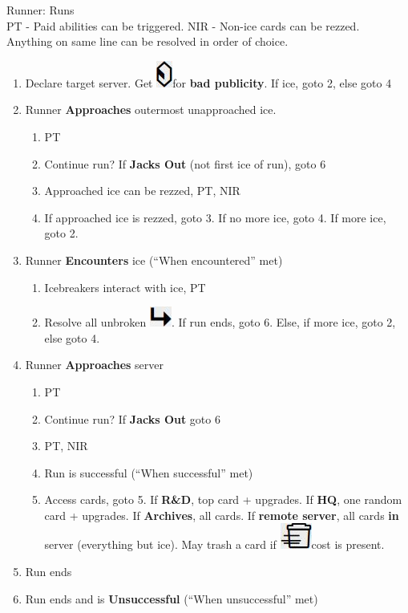 \documentclass[12pt]{article}
\newenvironment{enumerateCustom}
{\begin{enumerate}
  \setlength{\itemsep}{1pt}
  \setlength{\parskip}{0pt}
  \setlength{\parsep}{0pt}}
{\end{enumerate}}
\newcommand{\credit}{\includegraphics[scale=0.40]{images/creditLarge.jpg}\hspace{0.3em}}
\newcommand{\subroutineNoSpace}{\includegraphics[scale=0.40]{images/subroutineLarge.jpg}}
\newcommand{\trash}{\includegraphics[scale=0.40]{images/trashLarge.jpg}\hspace{0.3em}}
\begin{document}
\begin{multicols*}{2}
Runner: Runs
\\PT - Paid abilities can be triggered. NIR - Non-ice cards can be rezzed.\\
Anything on same line can be resolved in order of choice.
\begin{enumerateCustom}
	\item Declare target server. Get \credit for \textbf{bad publicity}. If ice, goto 2, else goto 4
	\item Runner \textbf{Approaches} outermost unapproached ice.
		\begin{enumerateCustom}
			\item PT
			\item Continue run? If \textbf{Jacks Out} (not first ice of run), goto 6
			\item Approached ice can be rezzed, PT, NIR
			\item If approached ice is rezzed, goto 3. If no more ice, goto 4. If more ice, goto 2.
		\end{enumerateCustom}
	\item Runner \textbf{Encounters} ice (``When encountered'' met)
		\begin{enumerateCustom}
			\item Icebreakers interact with ice, PT
			\item Resolve all unbroken \subroutineNoSpace. If run ends, goto 6. Else, if more ice, goto 2, else goto 4.
		\end{enumerateCustom}
	\item Runner \textbf{Approaches} server
		\begin{enumerateCustom}
			\item PT
			\item Continue run? If \textbf{Jacks Out} goto 6
			\item PT, NIR
			\item Run is successful (``When successful'' met)
			\item Access cards, goto 5. If \textbf{R\&D}, top card + upgrades. If \textbf{HQ}, one random card + upgrades. If \textbf{Archives}, all cards. If \textbf{remote server}, all cards \textbf{in} server (everything but ice). May trash a card if \trash cost is present.
		\end{enumerateCustom}
	\item Run ends
	\item Run ends and is \textbf{Unsuccessful} (``When unsuccessful'' met)
\end{enumerateCustom}


\end{multicols*}
\end{document}
